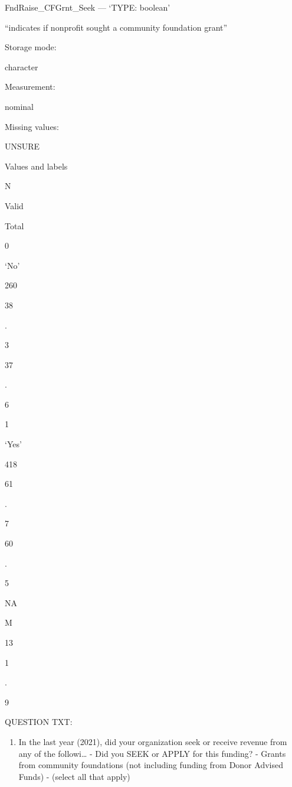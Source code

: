 \documentclass[
  letterpaper,
]{scrbook}
\providecommand{\tightlist}{%
  \setlength{\itemsep}{0pt}\setlength{\parskip}{0pt}}\usepackage{longtable,booktabs,array}
\begin{document}
\begin{enumerate}
\begin{enumerate}
\begin{enumerate}
\begin{enumerate}
\begin{enumerate}
\begin{enumerate}
\begin{enumerate}
              FndRaise\_CFGrnt\_Seek --- {`TYPE: boolean'}

              ``indicates if nonprofit sought a community foundation
              grant''

              Storage mode:

              character

              Measurement:

              nominal

              Missing values:

              UNSURE

              Values and labels

              N

              Valid

              Total

              0

              `No'

              260

              38

              .

              3

              37

              .

              6

              1

              `Yes'

              418

              61

              .

              7

              60

              .

              5

              NA

              M

              13

              1

              .

              9

              QUESTION TXT:

              \begin{enumerate}
              \def\labelenumviii{\arabic{enumviii}.}
              \tightlist
              \item
                In the last year (2021), did your organization seek or
                receive revenue from any of the followi\ldots{} - Did
                you SEEK or APPLY for this funding? - Grants from
                community foundations (not including funding from Donor
                Advised Funds) - (select all that apply)


\end{enumerate}
\end{enumerate}
\end{enumerate}
\end{enumerate}
\end{enumerate}
\end{enumerate}
\end{enumerate}
\end{enumerate}
\end{document}

